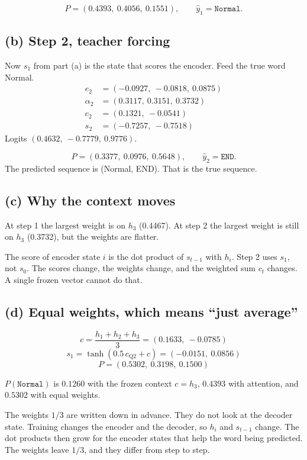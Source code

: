 \documentclass[11pt,a4paper]{article}
\newcommand{\tok}[1]{\texttt{#1}}
\begin{document}
\begin{answer}[Q3(a)]
\[
P=(0.4393,\ 0.4056,\ 0.1551),\qquad \hat y_1=\tok{Normal}.
\]
\end{answer}

\subsection{(b) Step 2, teacher forcing}

Now \(s_1\) from part (a) is the state that scores the encoder. Feed the true word Normal.
\begin{align*}
e_2&=(-0.0927,\ -0.0818,\ 0.0875)\\
\alpha_2&=(0.3117,\ 0.3151,\ 0.3732)\\
c_2&=(0.1321,\ -0.0541)\\
s_2&=(-0.7257,\ -0.7518)
\end{align*}
Logits \((0.4632,\ -0.7779,\ 0.9776)\).

\begin{answer}[Q3(b)]
\[
P=(0.3377,\ 0.0976,\ 0.5648),\qquad \hat y_2=\tok{END}.
\]
The predicted sequence is (Normal, END). That is the true sequence.
\end{answer}

\subsection{(c) Why the context moves}

\begin{answer}[Q3(c)]
At step 1 the largest weight is on \(h_3\) (0.4467). At step 2 the largest weight is still on \(h_3\) (0.3732), but the weights are flatter.

The score of encoder state \(i\) is the dot product of \(s_{t-1}\) with \(h_i\). Step 2 uses \(s_1\), not \(s_0\). The scores change, the weights change, and the weighted sum \(c_t\) changes. A single frozen vector cannot do that.
\end{answer}

\subsection{(d) Equal weights, which means ``just average''}

\[
c=\frac{h_1+h_2+h_3}{3}=(0.1633,\ -0.0785)
\]
\[
s_1=\tanh(0.5\,c_{\mathrm{Q2}}+c)=(-0.0151,\ 0.0856)
\]
\[
P=(0.5302,\ 0.3198,\ 0.1500)
\]

\begin{answer}[Q3(d)]
\(P(\tok{Normal})\) is \(0.1260\) with the frozen context \(c=h_3\), \(0.4393\) with attention, and \(0.5302\) with equal weights.

The weights \(1/3\) are written down in advance. They do not look at the decoder state. Training changes the encoder and the decoder, so \(h_i\) and \(s_{t-1}\) change. The dot products then grow for the encoder states that help the word being predicted. The weights leave \(1/3\), and they differ from step to step.
\end{answer}
\end{document}
